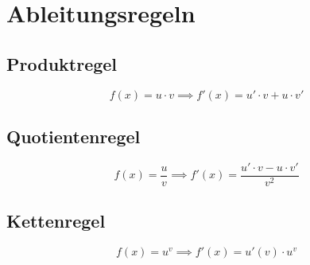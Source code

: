 \documentclass{article}
\begin{document}
\section{Ableitungsregeln}
\subsection{Produktregel}
\[ 
f(x)=u \cdot v \implies f'(x)=u' \cdot v+u \cdot v'
\]
 
\subsection{Quotientenregel}
\[ 
f(x)=\frac{u}{v} \implies f'(x)= \frac{u' \cdot v-u \cdot v'}{v^2}
\]
 
\subsection{Kettenregel}
\[ 
f(x)=u^v \implies f'(x)=u'(v) \cdot u^v
\]
 
\end{document}
